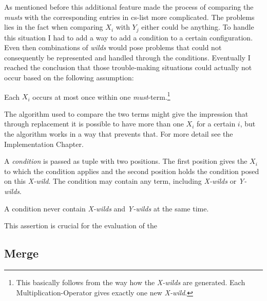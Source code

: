 As mentioned before this additional feature made the process of comparing the \emph{musts} with the corresponding entries in cs-list more complicated. The problems lies in the fact when comparing $X_i$ with $Y_j$ either could be anything. To handle this situation I had to add a way to add a condition to a certain configuration. Even then combinations of \emph{wilds} would pose problems that could not consequently be represented and handled through the conditions. Eventually I reached the conclusion that those trouble-making situations could actually not occur based on the following assumption:

\begin{assertion}
Each $X_i$ occurs at most once within one \emph{must}-term.\footnote{This basically follows from the way how the \emph{X-wilds} are generated. Each Multiplication-Operator gives exactly one new \emph{X-wild}.}
\end{assertion}

The algorithm used to compare the two terms might give the impression that through replacement it is possible to have more than one $X_i$ for a certain $i$, but the algorithm works in a way that prevents that. For more detail see the Implementation Chapter.

\begin{definition}
A \emph{condition} is passed as tuple with two positions. The first position gives the $X_i$ to which the condition applies and the second position holds the condition posed on this \emph{X-wild}. The condition may contain any term, including \emph{X-wilds} or \emph{Y-wilds}.
\end{definition}

\begin{assertion}
A condition never contain \emph{X-wilds} and \emph{Y-wilds} at the same time.
\end{assertion}

This assertion is crucial for the evaluation of the 

\subsection{Merge}



